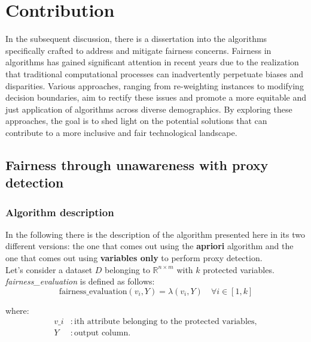 \documentclass[12pt,a4paper,openright,twoside]{book}
\begin{document}
%

\chapter{Contribution} %
\label{chap:contibution}
In the subsequent discussion, there is a dissertation into the algorithms specifically crafted to address and mitigate fairness concerns. Fairness in algorithms has gained significant attention in recent years due to the realization that traditional computational processes can inadvertently perpetuate biases and disparities. Various approaches, ranging from re-weighting instances to modifying decision boundaries, aim to rectify these issues and promote a more equitable and just application of algorithms across diverse demographics. By exploring these approaches, the goal is to shed light on the potential solutions that can contribute to a more inclusive and fair technological landscape.

\section{Fairness through unawareness with proxy detection}

\subsection{Algorithm description}
In the following there is the description of the algorithm presented here in its two different versions: the one that comes out using the \textbf{apriori} algorithm and the one that comes out using \textbf{variables only} to perform proxy detection. \\

Let's consider a dataset \( D \) belonging to \( \mathbb{R}^{n \times m} \) with \( k \) protected variables. \\

\textit{fairness\_evaluation} is defined as follows:
\[
\text{fairness\_evaluation}(v_i, Y) = \lambda(v_i, Y) \quad \forall i \in [1, k]
\]

where:
\begin{align*}
v\_i & : \text{ith attribute belonging to the protected variables}, \\
Y & : \text{output column}.
\end{align*}
\end{document}
